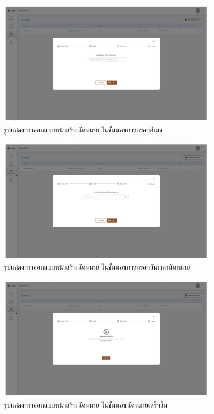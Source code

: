 \documentclass[12pt,oneside,openright,a4paper]{cpe-thai-project}
\begin{document}
\begin{figure}[!h]\centering
  \includegraphics[width=16cm]{./assets/userinterface/create-appointment-email.png}
  \caption{รูปแสดงการออกแบบหน้าสร้างนัดหมาย ในขั้นตอนการกรอกอีเมล}\label{fig:create-appointment-email}
\end{figure}

\begin{figure}[!h]\centering
  \includegraphics[width=16cm]{./assets/userinterface/create-appointment-datetime.png}
  \caption{รูปแสดงการออกแบบหน้าสร้างนัดหมาย ในขั้นตอนการกรอกวันเวลานัดหมาย}\label{fig:create-appointment-datetime}
\end{figure}

\begin{figure}[!h]\centering
  \includegraphics[width=16cm]{./assets/userinterface/create-appointment-done.png}
  \caption{รูปแสดงการออกแบบหน้าสร้างนัดหมาย ในขั้นตอนนัดหมายเสร็จสิ้น}\label{fig:create-appointment-done}
\end{figure}
\end{document}

